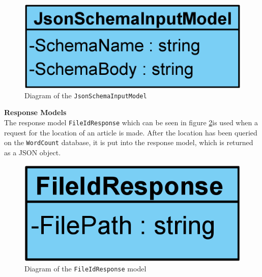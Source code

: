 \begin{figure}[H]
    \centering
    \includegraphics[scale=0.25]{Images/JsonSchemaInputModel.png}
    \caption{Diagram of the \texttt{JsonSchemaInputModel}}
    \label{JsonSchemaInputModel}
\end{figure}

\textbf{Response Models}\\
The response model \texttt{FileIdResponse} which can be seen in figure \ref*{FileIdResponse}is used when a request for the location of an article is made. 
After the location has been queried on the \texttt{WordCount} database, it is put into the response model, which is returned as a JSON object.

\begin{figure}[H]
    \centering
    \includegraphics[scale=0.25]{Images/FileIdResponse.png}
    \caption{Diagram of the \texttt{FileIdResponse} model}
    \label{FileIdResponse}
\end{figure}

